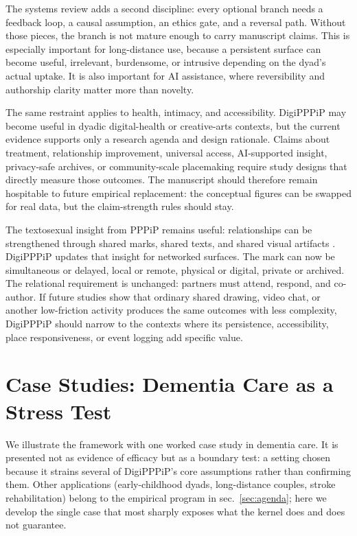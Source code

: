 \documentclass[
  english,
]{article}
\begin{document}
The systems review adds a second discipline: every optional branch needs
a feedback loop, a causal assumption, an ethics gate, and a reversal
path. Without those pieces, the branch is not mature enough to carry
manuscript claims. This is especially important for long-distance use,
because a persistent surface can become useful, irrelevant, burdensome,
or intrusive depending on the dyad's actual uptake. It is also important
for AI assistance, where reversibility and authorship clarity matter
more than novelty.

The same restraint applies to health, intimacy, and accessibility.
DigiPPPiP may become useful in dyadic digital-health or creative-arts
contexts, but the current evidence supports only a research agenda and
design rationale. Claims about treatment, relationship improvement,
universal access, AI-supported insight, privacy-safe archives, or
community-scale placemaking require study designs that directly measure
those outcomes. The manuscript should therefore remain hospitable to
future empirical replacement: the conceptual figures can be swapped for
real data, but the claim-strength rules should stay.

The textosexual insight from PPPiP remains useful: relationships can be
strengthened through shared marks, shared texts, and shared visual
artifacts \citep{mikhailova2018pppip}. DigiPPPiP updates that insight
for networked surfaces. The mark can now be simultaneous or delayed,
local or remote, physical or digital, private or archived. The
relational requirement is unchanged: partners must attend, respond, and
co-author. If future studies show that ordinary shared drawing, video
chat, or another low-friction activity produces the same outcomes with
less complexity, DigiPPPiP should narrow to the contexts where its
persistence, accessibility, place responsiveness, or event logging add
specific value.

\newpage

\section{Case Studies: Dementia Care as a Stress
Test}\label{sec:casestudies}

We illustrate the framework with one worked case study in dementia care.
It is presented not as evidence of efficacy but as a boundary test: a
setting chosen because it strains several of DigiPPPiP's core
assumptions rather than confirming them. Other applications
(early-childhood dyads, long-distance couples, stroke rehabilitation)
belong to the empirical program in sec.~\ref{sec:agenda}; here we
develop the single case that most sharply exposes what the kernel does
and does not guarantee.
\end{document}
